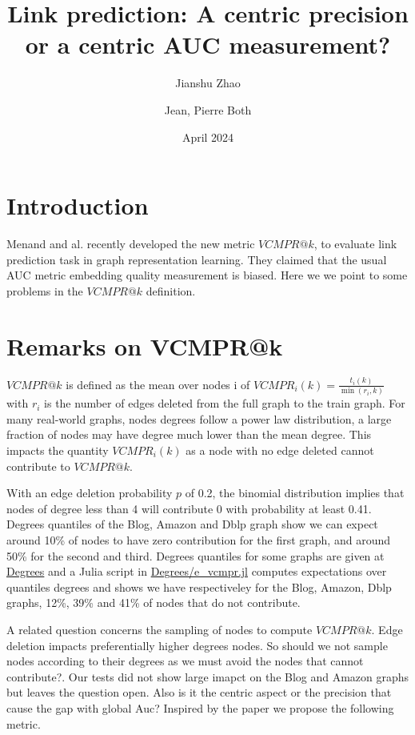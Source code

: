\documentclass{article}
\title{Link prediction: A centric precision or a centric AUC measurement?}
\author[1]{Jianshu Zhao}
\author[2,*]{Jean, Pierre Both}
\affil[1]{Center for Bioinformatics and Computational Genomics, Georgia Institute of Technology, Atlanta, Georgia, USA}
\affil[2]{Université Paris-Saclay, CEA, List, Palaiseau, France. (Retired)}
\affil[*]{Corresponding author : jeanpierre.both@gmail.com}
\date{April 2024}
\begin{document}
\maketitle

\section{Introduction}

Menand and al. \cite{Menand2024link} recently developed the new metric $VCMPR@k$, to evaluate link prediction task in graph representation learning.
They claimed that the usual AUC metric embedding quality measurement is biased.
Here we we point to some problems in the  $VCMPR@k$ definition.


\section{Remarks on VCMPR@k}
$VCMPR@k$ is defined as the mean over nodes i of  $ VCMPR_{i}(k)= \frac{t_{i}(k)}{\min(r_{i},k)}$ with $ r_{i} $ is the number of edges deleted from the full graph to the train graph.
For many real-world graphs, nodes degrees follow a power law distribution, a large fraction of nodes may have degree much lower than the mean degree.
This impacts the quantity $ VCMPR_{i}(k)$ as a node with no edge deleted cannot contribute to $VCMPR@k$.

With an edge deletion probability $p$ of 0.2, the binomial distribution implies that nodes of degree less than 4 will contribute 0 with probability at least 0.41.
Degrees quantiles of the Blog, Amazon and Dblp graph show we can expect around 10\% of nodes to have zero contribution for the first graph,
and around 50\% for the second and third.
Degrees quantiles for some graphs are given at \href{https://github.com/jean-pierreBoth/linkauc/tree/master/Degrees}{\color{blue}Degrees}
and a Julia script in \href{https://github.com/jean-pierreBoth/linkauc/tree/master/Degrees}{\color{blue}Degrees/e\_vcmpr.jl}
computes expectations over quantiles degrees and shows we have respectiveley for the Blog, Amazon, Dblp graphs, 12\%, 39\% and 41\% of nodes that do not contribute.

A related question concerns the sampling of nodes to compute $VCMPR@k$. Edge deletion impacts preferentially higher degrees nodes.
So should we not sample nodes according to their degrees as we must avoid the nodes that cannot contribute?.
Our tests did not show large imapct on the Blog and Amazon graphs but leaves the question open. Also is it the centric aspect or the precision that cause the gap with global Auc?
Inspired by the paper we propose the following metric.
\end{document}
